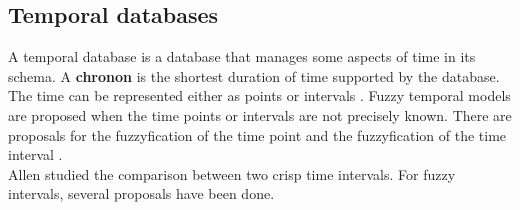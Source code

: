 %



\subsection{Temporal databases}
A temporal database \cite{Dyreson1994} is a database that manages some aspects of time in its schema. A \textbf{chronon} is the shortest duration of time supported by the database. The time can be represented either as points or intervals \cite{655777}. Fuzzy temporal models \cite{schockaert08} are proposed when the time points or intervals are not precisely known. There are proposals for the  fuzzyfication of the time point \cite{Dubois89} and the fuzzyfication of the time interval \cite{Garrido2009}.\\
Allen \cite{Allen83} studied the comparison between two crisp time intervals. For fuzzy intervals, several proposals \cite{ohlbach04,nagypal03,schockaert08} have been done.


